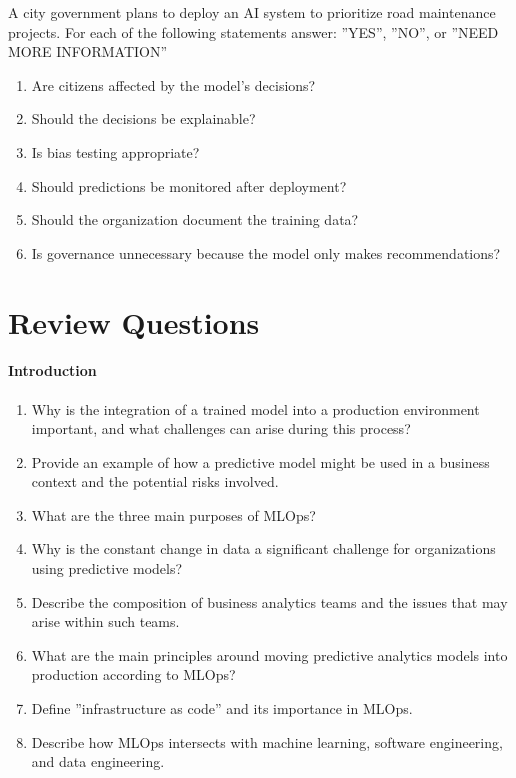 \begin{exerciseboxpaper}
A city government plans to deploy an AI system to prioritize road maintenance projects. For each of the following statements answer: ''YES'', ''NO'', or ''NEED MORE INFORMATION''

\bigskip

\begin{enumerate}
   \item Are citizens affected by the model's decisions? 
   \item Should the decisions be explainable? 
   \item Is bias testing appropriate? 
   \item Should predictions be monitored after deployment? 
   \item Should the organization document the training data?
   \item Is governance unnecessary because the model only makes recommendations? 
\end{enumerate}
\end{exerciseboxpaper}

\section{Review Questions}
\paragraph*{Introduction}
\begin{enumerate}[nosep]
    \item Why is the integration of a trained model into a production environment important, and what challenges can arise during this process?
    \item Provide an example of how a predictive model might be used in a business context and the potential risks involved.
    \item What are the three main purposes of MLOps?
    \item Why is the constant change in data a significant challenge for organizations using predictive models?
    \item Describe the composition of business analytics teams and the issues that may arise within such teams.
    \item What are the main principles around moving predictive analytics models into production according to MLOps?
    \item Define ''infrastructure as code'' and its importance in MLOps.
    \item Describe how MLOps intersects with machine learning, software engineering, and data engineering.
\end{enumerate}
